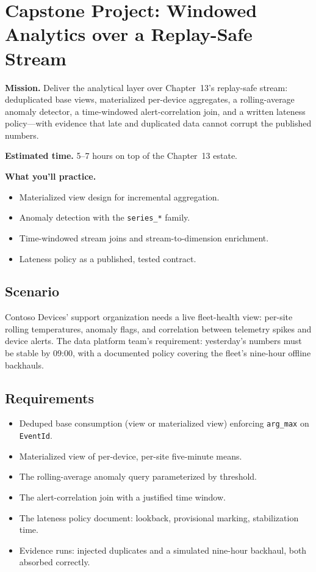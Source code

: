 \section{Capstone Project: Windowed Analytics over a Replay-Safe Stream}\label{sec:ch14-capstone}

\begin{capstonebox}
\textbf{Mission.} Deliver the analytical layer over Chapter~13's replay-safe stream: deduplicated base views, materialized per-device aggregates, a rolling-average anomaly detector, a time-windowed alert-correlation join, and a written lateness policy---with evidence that late and duplicated data cannot corrupt the published numbers.

\textbf{Estimated time.} 5--7 hours on top of the Chapter~13 estate.

\textbf{What you'll practice.}
\begin{itemize}
    \item Materialized view design for incremental aggregation.
    \item Anomaly detection with the \texttt{series\_*} family.
    \item Time-windowed stream joins and stream-to-dimension enrichment.
    \item Lateness policy as a published, tested contract.
\end{itemize}
\end{capstonebox}

\subsection*{Scenario}
Contoso Devices' support organization needs a live fleet-health view: per-site rolling temperatures, anomaly flags, and correlation between telemetry spikes and device alerts. The data platform team's requirement: yesterday's numbers must be stable by 09:00, with a documented policy covering the fleet's nine-hour offline backhauls.

\subsection*{Requirements}
\begin{itemize}
    \item Deduped base consumption (view or materialized view) enforcing \texttt{arg\_max} on \texttt{EventId}.
    \item Materialized view of per-device, per-site five-minute means.
    \item The rolling-average anomaly query parameterized by threshold.
    \item The alert-correlation join with a justified time window.
    \item The lateness policy document: lookback, provisional marking, stabilization time.
    \item Evidence runs: injected duplicates and a simulated nine-hour backhaul, both absorbed correctly.
\end{itemize}

